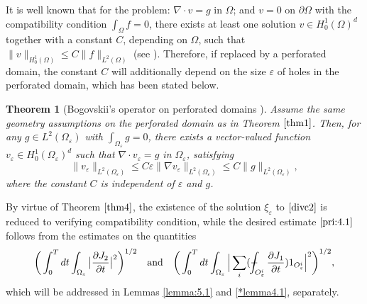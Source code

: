 \documentclass[13pt,CJK]{article}
\theoremstyle{plain}                       %
\newtheorem{theorem}[lemma]{Theorem}
\theoremstyle{remark}
\numberwithin{equation}{section}
\def\Xint#1{\mathchoice
  {\XXint\displaystyle\textstyle{#1}}%
  {\XXint\textstyle\scriptstyle{#1}}%
  {\XXint\scriptstyle\scriptscriptstyle{#1}}%
  {\XXint\scriptscriptstyle\scriptscriptstyle{#1}}%
  \!\int}
\def\XXint#1#2#3{{\setbox0=\hbox{$#1{#2#3}{\int}$}
  \vcenter{\hbox{$#2#3$}}\kern-.5\wd0}}
\def\dashint{\Xint-}
\begin{document}
It is well known that for the problem: $\nabla\cdot v = g$ in $\Omega$;
and $v=0$ on $\partial\Omega$ with the compatibility condition $\int_{\Omega}f=0$,
there exists at least one solution $v\in H^1_0(\Omega)^d$ together with a constant $C$, depending on $\Omega$, such that
$\|v\|_{H^1_0(\Omega)}\leq C\|f\|_{L^2(\Omega)}$
(see \cite[lemma III.3.1]{Galdi11}).
Therefore, if replaced by a perforated domain,
the constant $C$ will additionally depend on the size $\varepsilon$ of holes in the perforated domain,
which has been stated below.
\begin{theorem}[Bogovskii's operator on perforated domains
\cite{Chechkin-Piatnitski-Shamaev2007}]\label{thm4}
Assume the same geometry assumptions on the perforated domain
as in Theorem $\ref{thm1}$. Then, for any $g\in L^2(\Omega_{\varepsilon})$ with
$\int_{\Omega_{\varepsilon}}g =0$,
there exists a vector-valued function
$v_{\varepsilon}\in H^{1}_0(\Omega_{\varepsilon})^d$
such that $\nabla\cdot v_{\varepsilon} =g$ in $\Omega_\varepsilon$, satisfying
\begin{equation}\label{pde3.21}
\| v_{\varepsilon}
\|_{L^2(\Omega_{\varepsilon})}
\leq C\varepsilon\|\nabla v_{\varepsilon}
\|_{L^2(\Omega_{\varepsilon})}
\leq C
\|g\|_{L^2(\Omega_{\varepsilon})},
\end{equation}
where the constant $C$ is independent of $\varepsilon$ and $g$.
\end{theorem}


By virtue of Theorem $\ref{thm4}$,
the existence of the solution $\xi_{\varepsilon}$ to $\eqref{divc2}$ is reduced to
verifying compatibility condition, while the desired estimate $\eqref{pri:4.1}$  follows from the estimates on the quantities
\begin{equation}\label{f:1}
\bigg(
\int_{0}^{T}dt\int_{\Omega_{\varepsilon}}
\big|\frac{\partial J_2}{\partial t}\big|^2\bigg)^{1/2}
\quad\text{and}\quad
\bigg(\int_{0}^{T}dt\int_{\Omega_{\varepsilon}}\Big|
\sum_{i}(\dashint_{O_{\varepsilon}^i}\frac{\partial J_1}{\partial t}) 1_{O_{\varepsilon}^i}\Big|^2
\bigg)^{1/2},
\end{equation}
which will be addressed in Lemmas \ref{lemma:5.1} and \ref{*lemma4.1},   separately.
\end{document}
